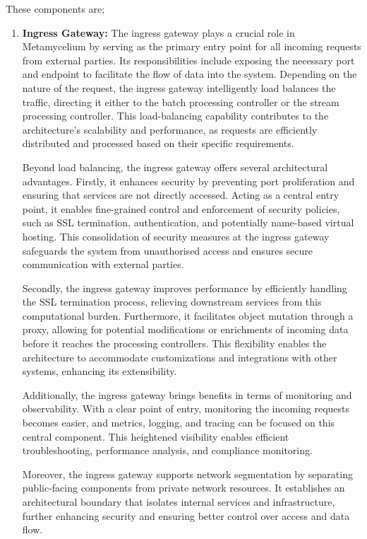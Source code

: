 \documentclass[preprint,12pt]{elsarticle}
\begin{document}
These components are;

\begin{enumerate}
    \item \textbf{Ingress Gateway:} The ingress gateway plays a crucial role in Metamycelium by serving as the primary entry point for all incoming requests from external parties. Its responsibilities include exposing the necessary port and endpoint to facilitate the flow of data into the system. Depending on the nature of the request, the ingress gateway intelligently load balances the traffic, directing it either to the batch processing controller or the stream processing controller. This load-balancing capability contributes to the architecture's scalability and performance, as requests are efficiently distributed and processed based on their specific requirements.

    Beyond load balancing, the ingress gateway offers several architectural advantages. Firstly, it enhances security by preventing port proliferation and ensuring that services are not directly accessed. Acting as a central entry point, it enables fine-grained control and enforcement of security policies, such as SSL termination, authentication, and potentially name-based virtual hosting. This consolidation of security measures at the ingress gateway safeguards the system from unauthorised access and ensures secure communication with external parties.
    
    Secondly, the ingress gateway improves performance by efficiently handling the SSL termination process, relieving downstream services from this computational burden. Furthermore, it facilitates object mutation through a proxy, allowing for potential modifications or enrichments of incoming data before it reaches the processing controllers. This flexibility enables the architecture to accommodate customizations and integrations with other systems, enhancing its extensibility.
    
    Additionally, the ingress gateway brings benefits in terms of monitoring and observability. With a clear point of entry, monitoring the incoming requests becomes easier, and metrics, logging, and tracing can be focused on this central component. This heightened visibility enables efficient troubleshooting, performance analysis, and compliance monitoring.
    
    Moreover, the ingress gateway supports network segmentation by separating public-facing components from private network resources. It establishes an architectural boundary that isolates internal services and infrastructure, further enhancing security and ensuring better control over access and data flow.
    

\end{enumerate}
\end{document}
